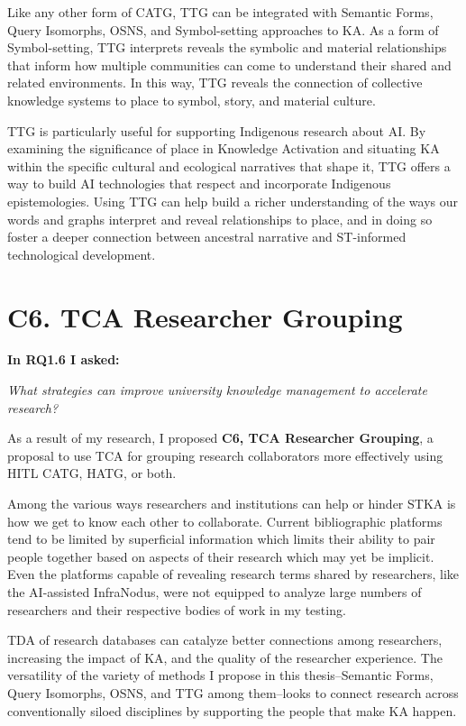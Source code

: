 Like any other form of CATG, TTG can be integrated with Semantic Forms, Query Isomorphs, OSNS, and Symbol-setting approaches to KA. As a form of Symbol-setting, TTG interprets reveals the symbolic and material relationships that inform how multiple communities can come to understand their shared and related environments. In this way, TTG reveals the connection of collective knowledge systems to place to symbol, story, and material culture. 

TTG is particularly useful for supporting Indigenous research about AI. By examining the significance of place in Knowledge Activation and situating  KA within the specific cultural and ecological narratives that shape it, TTG offers a way to build AI technologies that respect and incorporate Indigenous epistemologies. Using TTG can help build a richer understanding of the ways our words and graphs interpret and reveal relationships to place, and in doing so foster a deeper connection between ancestral narrative and ST-informed technological development.
\section{C6. TCA Researcher Grouping}


\noindent\textbf{In RQ1.6 I asked:}

\textit{What strategies can improve university knowledge management to accelerate research?}

As a result of my research, I proposed \textbf{C6, TCA Researcher Grouping}, a proposal to use TCA for grouping research collaborators more effectively using HITL CATG, HATG, or both.

\vspace{1em}


Among the various ways researchers and institutions can help or hinder STKA is how we get to know each other to collaborate. Current bibliographic platforms tend to be limited by superficial information which limits their ability to pair people together based on aspects of their research which may yet be implicit. Even the platforms capable of revealing research terms shared by researchers, like the AI-assisted InfraNodus, were not equipped to analyze large numbers of researchers and their respective bodies of work in my testing.

TDA of research databases can catalyze better connections among researchers, increasing the impact of KA, and the quality of the researcher experience. The versatility of the variety of methods I propose in this thesis–Semantic Forms, Query Isomorphs, OSNS, and TTG among them–looks to connect research across conventionally siloed disciplines by supporting the people that make KA happen.   

